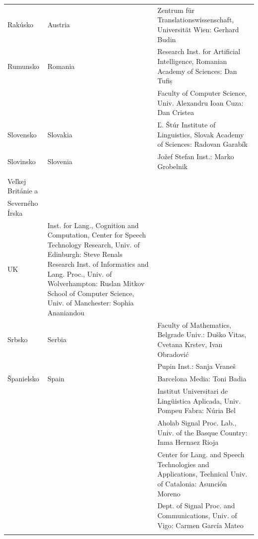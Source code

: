 \begin{longtable}{@{}llp{113mm}@{}}
  Rakúsko & \textcolor{grey1}{Austria} & Zentrum für Translationswissenschaft, Universität Wien: Gerhard Budin\\ \addlinespace 
  Rumunsko & \textcolor{grey1}{Romania} & Research Inst. for Artificial Intelligence, Romanian Academy of Sciences: Dan Tufiș \\ \addlinespace  & & Faculty of Computer Science, Univ. Alexandru Ioan Cuza: Dan Cristea \\ \addlinespace
  Slovensko & \textcolor{grey1}{Slovakia} & Ľ. Štúr Institute of Linguistics, Slovak Academy of Sciences: Radovan Garabík \\ \addlinespace 
  Slovinsko & \textcolor{grey1}{Slovenia} & Jožef Stefan Inst.: Marko Grobelnik \\ \addlinespace 
      \begin{minipage}[t]{0.2\columnwidth}%
      Spojené kráľovstvo \\
      Veľkej Británie a \\
      Severného Írska 
      \end{minipage}
            & \begin{minipage}[t]{0.15\columnwidth}%
                \hfill \\
                \textcolor{grey1}{UK} 
              \end{minipage}
            & Inst. for Lang., Cognition and Computation, Center for Speech Technology Research, Univ. of Edinburgh: Steve Renals \newline Research Inst. of Informatics and Lang. Proc., Univ. of Wolverhampton: Ruslan Mitkov \newline School of Computer Science, Univ. of Manchester: Sophia Ananiandou  \\ \addlinespace 
  Srbsko & \textcolor{grey1}{Serbia} & Faculty of Mathematics, Belgrade Univ.: Duško Vitas, Cvetana Krstev, Ivan Obradović \\ \addlinespace  & & Pupin Inst.: Sanja Vraneš \\ \addlinespace  
  Španielsko & \textcolor{grey1}{Spain} & Barcelona Media: Toni Badia \\ \addlinespace   & & Institut Universitari de Lingüistica Aplicada, Univ. Pompeu Fabra: Núria Bel \\ \addlinespace   & & Aholab Signal Proc. Lab., Univ. of the Basque Country: Inma Hernaez Rioja \\ \addlinespace   & & Center for Lang. and Speech Technologies and Applications, Technical Univ. of Catalonia: Asunción Moreno \\ \addlinespace   & & Dept. of Signal Proc. and Communications, Univ. of Vigo: Carmen García Mateo \\ \addlinespace 

\end{longtable}
